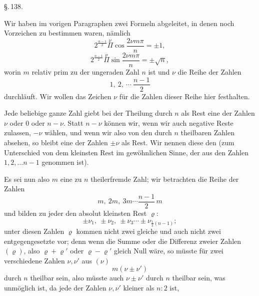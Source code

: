 \begin{center}
\S.\,138.

\end{center}

Wir haben im vorigen Paragraphen zwei Formeln abgeleitet, in denen noch Vorzeichen zu bestimmen waren, nämlich
\[
2^{\frac{n-1}{2}} \overset{\nu}{\Pi} \cos\frac{2\nu m\pi}{n} = \pm 1, \tag{1}
\]
\[
2^{\frac{n-1}{2}} \overset{\nu}{\Pi} \sin\frac{2\nu m\pi}{n} = \pm \sqrt{n}, \tag{2}
\]
worin $m$ relativ prim zu der ungeraden Zahl $n$ ist und $\nu$ die Reihe der Zahlen
\[
1,\ 2,\ \cdots\ \frac{n-1}{2} \tag{$\nu$}
\]
durchläuft. Wir wollen das Zeichen $\nu$ für die Zahlen dieser Reihe hier festhalten.

Jede beliebige ganze Zahl giebt bei der Theilung durch $n$ als Rest eine der Zahlen $\nu$ oder $0$ oder $n-\nu$. Statt $n-\nu$ können wir, wenn wir auch negative Reste zulassen, $-\nu$ wählen, und wenn wir also von den durch $n$ theilbaren Zahlen absehen, so bleibt eine der Zahlen $\pm\nu$ als Rest. Wir nennen diese den  (zum Unterschied von dem kleinsten Rest im gewöhnlichen Sinne, der aus den Zahlen $1, 2, \ldots n-1$ genommen ist).

Es sei nun also $m$ eine zu $n$ theilerfremde Zahl; wir betrachten die Reihe der Zahlen
\[
m,\ 2m,\ 3m \cdots \frac{n-1}{2}\, m \tag{$m\nu$}
\]
und bilden zu jeder den absolut kleinsten Rest $\varrho$:
\[
\pm \nu_1,\ \pm \nu_2,\ \pm \nu_3 \cdots \pm \nu_{\frac{1}{2}(n-1)}; \tag{$\varrho$}
\]
unter diesen Zahlen $\varrho$ kommen nicht zwei gleiche und auch nicht zwei entgegengesetzte vor; denn wenn die Summe oder die Differenz zweier Zahlen $(\varrho)$, also $\varrho+\varrho'$ oder $\varrho-\varrho'$ gleich Null wäre, so müsste für zwei verschiedene Zahlen $\nu, \nu'$ aus $(\nu)$
\[
m(\nu \pm \nu')
\]
durch $n$ theilbar sein, also müsste auch $\nu \pm \nu'$ durch $n$ theilbar sein, was unmöglich ist, da jede der Zahlen $\nu, \nu'$ kleiner als $n:2$ ist,

